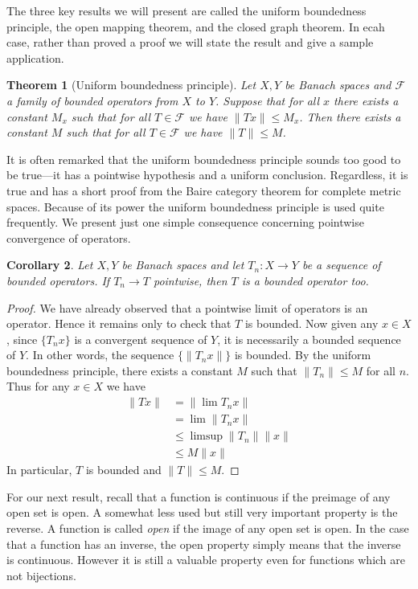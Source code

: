 \documentclass[11pt,oneside]{amsbook}
\theoremstyle{definition}
\theoremstyle{plain}
\newtheorem{thm}{Theorem}[section]
\newtheorem{cor}[thm]{Corollary}
\theoremstyle{definition}
\theoremstyle{remark}
\numberwithin{equation}{section}
\numberwithin{figure}{section}
\begin{document}
The three key results we will present are called the uniform boundedness principle, the open mapping theorem, and the closed graph theorem. In ecah case, rather than proved a proof we will state the result and give a sample application.

\begin{thm}[Uniform boundedness principle]
  Let $X,Y$ be Banach spaces and $\mathcal F$ a family of bounded operators from $X$ to $Y$. Suppose that for all $x$ there exists a constant $M_x$ such that for all $T\in\mathcal F$ we have $\|Tx\|\leq M_x$. Then there exists a constant $M$ such that for all $T\in\mathcal F$ we have $\|T\|\leq M$.
\end{thm}

It is often remarked that the uniform boundedness principle sounds too good to be true---it has a pointwise hypothesis and a uniform conclusion. Regardless, it is true and has a short proof from the Baire category theorem for complete metric spaces. Because of its power the uniform boundedness principle is used quite frequently. We present just one simple consequence concerning pointwise convergence of operators.

\begin{cor}
  Let $X,Y$ be Banach spaces and let $T_n\colon X\to Y$ be a sequence of bounded operators. If $T_n\to T$ pointwise, then $T$ is a bounded operator too.
\end{cor}

\begin{proof}
  We have already observed that a pointwise limit of operators is an operator. Hence it remains only to check that $T$ is bounded. Now given any $x\in X$, since $\{T_nx\}$ is a convergent sequence of $Y$, it is necessarily a bounded sequence of $Y$. In other words, the sequence $\{\|T_nx\|\}$ is bounded. By the uniform boundedness principle, there exists a constant $M$ such that $\|T_n\|\leq M$ for all $n$. Thus for any $x\in X$ we have
  \begin{align*}
    \|Tx\|&=\|\lim T_nx\|\\
          &=\lim\|T_nx\|\\
          &\leq\limsup\|T_n\|\|x\|\\
          &\leq M\|x\|
  \end{align*}
  In particular, $T$ is bounded and $\|T\|\leq M$.
\end{proof}

For our next result, recall that a function is continuous if the preimage of any open set is open. A somewhat less used but still very important property is the reverse. A function is called \emph{open} if the image of any open set is open. In the case that a function has an inverse, the open property simply means that the inverse is continuous. However it is still a valuable property even for functions which are not bijections.
\end{document}
